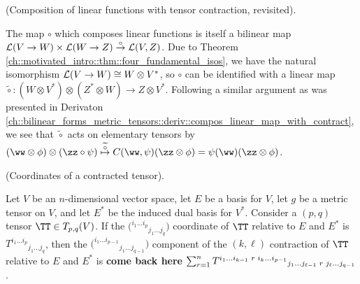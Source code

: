 \begin{remark}
    (Composition of linear functions with tensor contraction, revisited). 
    
    The map $\circ$ which composes linear functions is itself a bilinear map ${\mathcal{L}(V \rightarrow W) \times \mathcal{L}(W \rightarrow Z) \overset{\circ}{\rightarrow} \mathcal{L}(V, Z)}$. Due to Theorem \ref{ch::motivated_intro::thm::four_fundamental_isos}, we have the natural isomorphism $\mathcal{L}(V \rightarrow W) \cong W \otimes V^*$, so $\circ$ can be identified with a linear map $\widetilde{\circ}:(W \otimes V^*) \otimes (Z^* \otimes W) \rightarrow Z \otimes V^*$. Following a similar argument as was presented in Derivaton \ref{ch::bilinear_forms_metric_tensors::deriv::compos_linear_map_with_contract}, we see that $\widetilde{\circ}$ acts on elementary tensors by $(\ww \otimes \phi) \otimes (\zz \circ \psi) \overset{\widetilde{\circ}}{\mapsto} C(\ww, \psi) (\zz \otimes \phi) = \psi(\ww) (\zz \otimes \phi)$.
\end{remark}

\begin{theorem}
    (Coordinates of a contracted tensor).

    Let $V$ be an $n$-dimensional vector space, let $E$ be a basis for $V$, let $g$ be a metric tensor on $V$, and let $E^*$ be the induced dual basis for $V^*$. Consider a $(p, q)$ tensor $\TT \in T_{p,q}(V)$. If the $\Big( {}^{i_1 ... i_p}{}_{j_1 ... j_q} \Big)$ coordinate of $\TT$ relative to $E$ and $E^*$ is $T^{i_1 ... i_p}{}_{j_1 ... j_q}$, then the $\Big( ^{i_1 ... i_{p - 1}}{}_{j_1 ... j_{q - 1}} \Big)$ component of the $(k, \ell)$ contraction of $\TT$ relative to $E$ and $E^*$ is \textbf{come back here} $\sum_{r = 1}^n T^{i_1 ... i_{k - 1} \text{ } r \text{ } i_k ... i_{p - 1}}{}_{j_1 ... j_{\ell - 1} \text{ } r \text{ } j_{\ell} ... j_{q - 1}}$.
\end{theorem}

